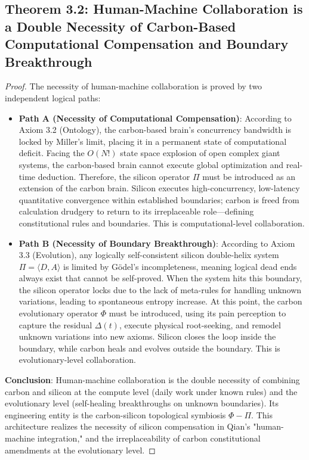 \documentclass[11pt,a4paper]{article}
\begin{document}
\subsection*{Theorem 3.2: Human-Machine Collaboration is a Double Necessity of Carbon-Based Computational Compensation and Boundary Breakthrough}
\begin{proof}
The necessity of human-machine collaboration is proved by two independent logical paths:
\begin{itemize}
    \item \textbf{Path A (Necessity of Computational Compensation)}: According to Axiom 3.2 (Ontology), the carbon-based brain's concurrency bandwidth is locked by Miller's limit, placing it in a permanent state of computational deficit. Facing the $O(N!)$ state space explosion of open complex giant systems, the carbon-based brain cannot execute global optimization and real-time deduction. Therefore, the silicon operator $\Pi$ must be introduced as an extension of the carbon brain. Silicon executes high-concurrency, low-latency quantitative convergence within established boundaries; carbon is freed from calculation drudgery to return to its irreplaceable role—defining constitutional rules and boundaries. This is computational-level collaboration.
    \item \textbf{Path B (Necessity of Boundary Breakthrough)}: According to Axiom 3.3 (Evolution), any logically self-consistent silicon double-helix system $\Pi=\langle D, A \rangle$ is limited by G\"odel's incompleteness, meaning logical dead ends always exist that cannot be self-proved. When the system hits this boundary, the silicon operator locks due to the lack of meta-rules for handling unknown variations, leading to spontaneous entropy increase. At this point, the carbon evolutionary operator $\Phi$ must be introduced, using its pain perception to capture the residual $\Delta(t)$, execute physical root-seeking, and remodel unknown variations into new axioms. Silicon closes the loop inside the boundary, while carbon heals and evolves outside the boundary. This is evolutionary-level collaboration.
\end{itemize}
\textbf{Conclusion}: Human-machine collaboration is the double necessity of combining carbon and silicon at the compute level (daily work under known rules) and the evolutionary level (self-healing breakthroughs on unknown boundaries). Its engineering entity is the carbon-silicon topological symbiosis $\Phi - \Pi$. This architecture realizes the necessity of silicon compensation in Qian's "human-machine integration," and the irreplaceability of carbon constitutional amendments at the evolutionary level.
\end{proof}
\end{document}
